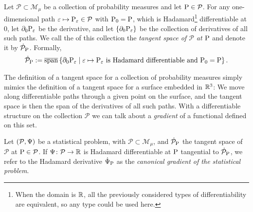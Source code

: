 \documentclass[a4,danish]{article}
\begin{document}
\begin{definition}
  Let $\mathcal{P} \subset \mathcal{M}_{\mu}$ be a collection of probability measures and let
  $\P \in \mathcal{P}$. For any one-dimensional path
  $\epsilon \mapsto \P_{\epsilon} \in \mathcal{P}$ with $\P_0 =\P$, which is Hadamard\footnote{When
    the domain is $\R$, all the previously considered types of differentiability are equivalent, so
    any type could be used here.} differentiable at 0, let $\partial_0{\P_{\epsilon}}$ be the
  derivative, and let $\{\partial_0{\P_{\epsilon}}\}$ be the collection of derivatives of all such paths. We call
  the  of this collection the \textit{tangent space of
    $\mathcal{P}$ at $\P$} and denote it by $\dot{\mathcal{P}}_{\P}$. Formally,
  \begin{equation*}
    \dot{\mathcal{P}}_{\P}
    := \overline{\mathrm{span}}
    \left\{ \partial_0{\P_{\epsilon}}
      \midd \epsilon \mapsto \P_{\epsilon} \text{ is Hadamard differentiable and } \P_0 = \P  \right\}.
  \end{equation*}
\end{definition}

The definition of a tangent space for a collection of probability
measures simply mimics the definition of a tangent space for a surface
embedded in $\R^3$: We move along differentiable paths through a given
point on the surface, and the tangent space is then the span of the
derivatives of all such paths. With a differentiable structure on the
collection $\mathcal{P}$ we can talk about a \textit{gradient} of a
functional defined on this set.

\begin{definition}
  \label{def:tangt-space-prob}
  Let $(\mathcal{P}, \TT)$ be a statistical problem, with $\mathcal{P} \subset \mathcal{M}_{\mu}$,
  and $\dot{\mathcal{P}}_{\P}$ the tangent space of $\mathcal{P}$ at $\P \in \mathcal{P}$. If
  $\TT \colon \mathcal{P} \rightarrow \R$ is Hadamard differentiable at $\P$ tangential to
  $\dot{\mathcal{P}}_{\P}$, we refer to the Hadamard derivative $\dot{\TT}_{\P}$ as the
  \textit{canonical gradient of the statistical problem}.
\end{definition}
\end{document}
